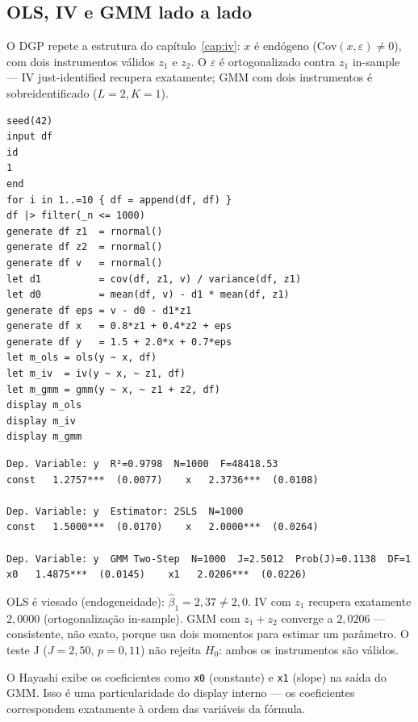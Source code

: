 \subsection*{OLS, IV e GMM lado a lado}

O DGP repete a estrutura do capítulo~\ref{cap:iv}: $x$ é endógeno ($\mathrm{Cov}(x,\varepsilon)
\neq 0$), com dois instrumentos válidos $z_1$ e $z_2$. O $\varepsilon$ é
ortogonalizado contra $z_1$ in-sample — IV just-identified recupera
exatamente; GMM com dois instrumentos é sobreidentificado ($L=2, K=1$).

\begin{lstlisting}[caption={DGP GMM — OLS viesado, IV exato, GMM eficiente}]
seed(42)
input df
id
1
end
for i in 1..=10 { df = append(df, df) }
df |> filter(_n <= 1000)
generate df z1  = rnormal()
generate df z2  = rnormal()
generate df v   = rnormal()
let d1          = cov(df, z1, v) / variance(df, z1)
let d0          = mean(df, v) - d1 * mean(df, z1)
generate df eps = v - d0 - d1*z1
generate df x   = 0.8*z1 + 0.4*z2 + eps
generate df y   = 1.5 + 2.0*x + 0.7*eps
let m_ols = ols(y ~ x, df)
let m_iv  = iv(y ~ x, ~ z1, df)
let m_gmm = gmm(y ~ x, ~ z1 + z2, df)
display m_ols
display m_iv
display m_gmm
\end{lstlisting}

\begin{lstlisting}[language={}, basicstyle=\ttfamily\scriptsize,
  frame=none, numbers=none, backgroundcolor=\color{codbg},
  xleftmargin=0pt, xrightmargin=0pt, breaklines=false]
Dep. Variable: y  R²=0.9798  N=1000  F=48418.53
const   1.2757***  (0.0077)    x   2.3736***  (0.0108)

Dep. Variable: y  Estimator: 2SLS  N=1000
const   1.5000***  (0.0170)    x   2.0000***  (0.0264)

Dep. Variable: y  GMM Two-Step  N=1000  J=2.5012  Prob(J)=0.1138  DF=1
x0   1.4875***  (0.0145)    x1   2.0206***  (0.0226)
\end{lstlisting}

OLS é viesado (endogeneidade): $\hat\beta_1 = 2{,}37 \neq 2{,}0$. IV com $z_1$
recupera exatamente $2{,}0000$ (ortogonalização in-sample). GMM com $z_1 + z_2$
converge a $2{,}0206$ — consistente, não exato, porque usa dois momentos para
estimar um parâmetro. O teste J ($J = 2{,}50$, $p = 0{,}11$) não rejeita
$H_0$: ambos os instrumentos são válidos.

\begin{nota}
  O Hayashi exibe os coeficientes como \texttt{x0} (constante) e \texttt{x1}
  (slope) na saída do GMM. Isso é uma particularidade do display interno —
  os coeficientes correspondem exatamente à ordem das variáveis da fórmula.
\end{nota}

